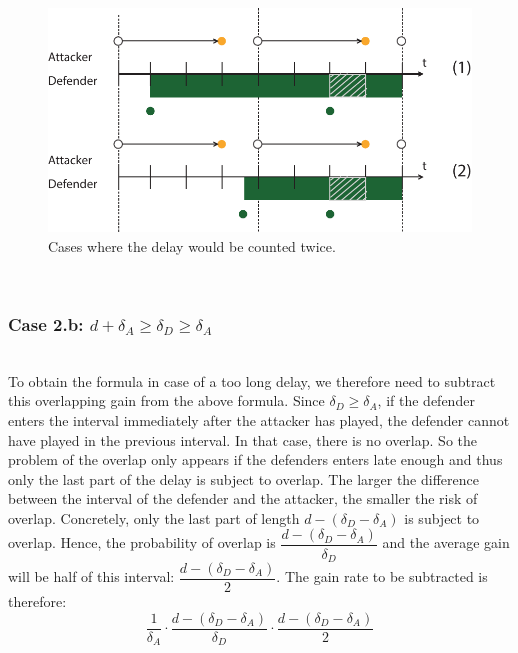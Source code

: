 \begin{figure}[hbtp]
\centering
\includegraphics[scale=0.7]{Images/flipcase2nb.pdf}
\caption{Cases where the delay would be counted twice.}
\label{countedtwice}
\end{figure}

~~ \\
\subsubsection*{\textbf{Case 2.b:} $d + \delta_{A} \geq \delta_{D} \geq \delta_{A}$}
~~~\\

To obtain the formula in case of a too long delay, we therefore need to subtract this overlapping gain from the above formula. 
Since $\delta_{D} \geq \delta_{A}$, if the defender enters the interval immediately after the attacker has played, the defender cannot have played in the previous interval. In that case, there is no overlap. So the problem of the overlap only appears if the defenders enters late enough and thus only the last part of the delay is subject to overlap. The larger the difference between the interval of the defender and the attacker, the smaller the risk of overlap. Concretely, only the last part of length $d - (\delta_{D} - \delta_{A})$ is subject to overlap. Hence, the probability of overlap is $\dfrac{ d - (\delta_{D} - \delta_{A})}{\delta_{D}}$ and the average gain will be half of this interval:  $\dfrac{ d - (\delta_{D} - \delta_{A})}{2}$.  The gain rate to be subtracted is therefore:\\

\begin{equation*}
\dfrac{1} {\delta_{A}} \cdot \dfrac{d - (\delta_{D} - \delta_{A})}{\delta_{D}} \cdot \dfrac{d - (\delta_{D} - \delta_{A})}{2}
\end{equation*}

